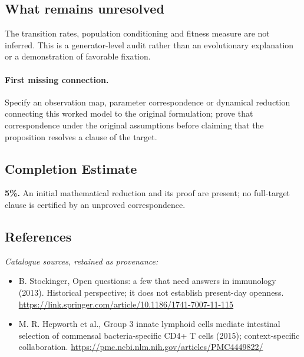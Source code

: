 \documentclass[11pt]{article}
\begin{document}
\subsection{What remains unresolved}
The transition rates, population conditioning and fitness measure are not inferred. This is a generator-level audit rather than an evolutionary explanation or a demonstration of favorable fixation.
\paragraph{First missing connection.} Specify an observation map, parameter correspondence or dynamical reduction connecting this worked model to the original formulation; prove that correspondence under the original assumptions before claiming that the proposition resolves a clause of the target.
\subsection{Completion Estimate}
\textbf{5\%.} An initial mathematical reduction and its proof are present; no full-target clause is certified by an unproved correspondence.
\subsection{References}
\noindent\emph{Catalogue sources, retained as provenance:}
\begin{itemize}
\item B. Stockinger, Open questions: a few that need answers in immunology (2013). Historical perspective; it does not establish present-day openness. \url{https://link.springer.com/article/10.1186/1741-7007-11-115}
\item M. R. Hepworth et al., Group 3 innate lymphoid cells mediate intestinal selection of commensal bacteria-specific CD4+ T cells (2015); context-specific collaboration. \url{https://pmc.ncbi.nlm.nih.gov/articles/PMC4449822/}
\end{itemize}
\clearpage


\appendix
\end{document}
